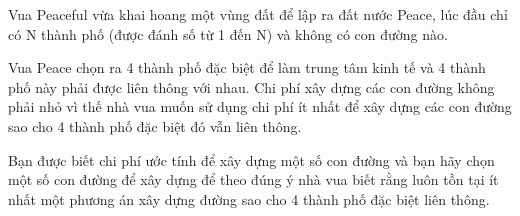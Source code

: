 Vua Peaceful vừa khai hoang một vùng đất để lập ra đất nước Peace, lúc đầu chỉ có N thành phố (được đánh số từ 1 đến N) và không có con đường nào.  

   Vua Peace chọn ra 4 thành phố đặc biệt để làm trung tâm kinh tế và 4 thành phố này phải được liên thông với nhau. Chi phí xây dựng các con đường không phải nhỏ vì thế nhà vua muốn sử dụng chi phí ít nhất để xây dựng các con đường sao cho 4 thành phố đặc biệt đó vẫn liên thông.  

   Bạn được biết chi phí ước tính để xây dựng một số con đường và bạn hãy chọn một số con đường để xây dựng để theo đúng ý nhà vua biết rằng luôn tồn tại ít nhất một phương án xây dựng đường sao cho 4 thành phố đặc biệt liên thông.  

\